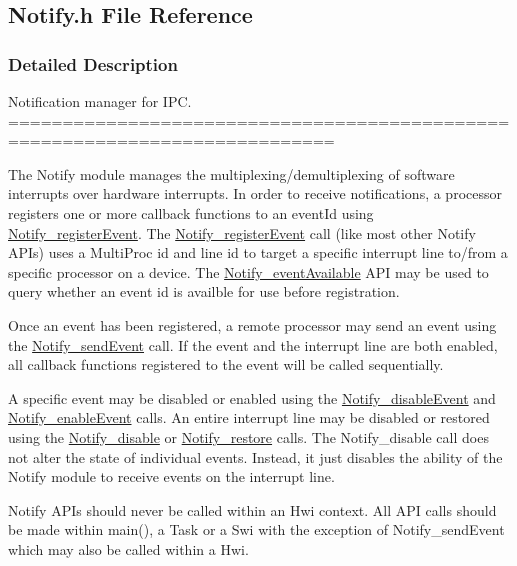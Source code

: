 \subsection{Notify.h File Reference}
\label{_notify_8h}


\subsubsection{Detailed Description}
Notification manager for IPC. ============================================================================

The Notify module manages the multiplexing/demultiplexing of software interrupts over hardware interrupts. In order to receive notifications, a processor registers one or more callback functions to an eventId using \hyperlink{_notify_8h_af0e6797faaeea3d07121ad83394dd1cb}{Notify\_\-registerEvent}. The \hyperlink{_notify_8h_af0e6797faaeea3d07121ad83394dd1cb}{Notify\_\-registerEvent} call (like most other Notify APIs) uses a MultiProc id and line id to target a specific interrupt line to/from a specific processor on a device. The \hyperlink{_notify_8h_a35609c7bf129016087dd520be69c14cf}{Notify\_\-eventAvailable} API may be used to query whether an event id is availble for use before registration.

Once an event has been registered, a remote processor may send an event using the \hyperlink{_notify_8h_ac0f8b4cb2245dd897b5b75485f6b5c13}{Notify\_\-sendEvent} call. If the event and the interrupt line are both enabled, all callback functions registered to the event will be called sequentially.

A specific event may be disabled or enabled using the \hyperlink{_notify_8h_acb0512fe9bdbc30a1bd6d055d3c662d0}{Notify\_\-disableEvent} and \hyperlink{_notify_8h_a701ab77f8cd9b811dcca05e243815b85}{Notify\_\-enableEvent} calls. An entire interrupt line may be disabled or restored using the \hyperlink{_notify_8h_a0eeb5a2e898a287ec0e31be4e6a92364}{Notify\_\-disable} or \hyperlink{_notify_8h_a07248810e2b457664a2a1f24a4179621}{Notify\_\-restore} calls. The Notify\_\-disable call does not alter the state of individual events. Instead, it just disables the ability of the Notify module to receive events on the interrupt line.

Notify APIs should never be called within an Hwi context. All API calls should be made within main(), a Task or a Swi with the exception of Notify\_\-sendEvent which may also be called within a Hwi.

